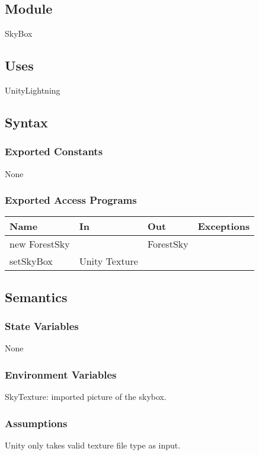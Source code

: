 \documentclass[12pt, titlepage]{article}
\begin{document}
\subsection{Module}

SkyBox

\subsection{Uses}

UnityLightning

\subsection{Syntax}

\subsubsection{Exported Constants}
None
\subsubsection{Exported Access Programs}


\begin{center}
\begin{tabular}{|p{3cm}|p{4cm}|p{4cm}| p{5cm}|}
\hline
\textbf{Name} & \textbf{In} & \textbf{Out} & \textbf{Exceptions} \\
\hline
new ForestSky & & ForestSky & \\
\hline
setSkyBox & Unity Texture & & \\ 
\hline
\end{tabular}
\end{center}

\subsection{Semantics}

\subsubsection{State Variables}
None

\subsubsection{Environment Variables}
SkyTexture: imported picture of the skybox.

\subsubsection{Assumptions}
Unity only takes valid texture file type as input.
\end{document}
